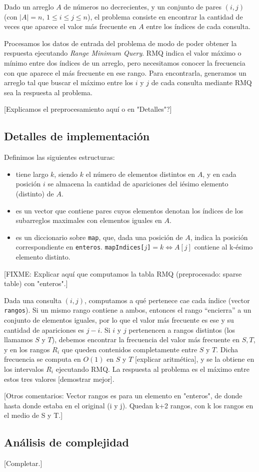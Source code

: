 Dado un arreglo $A$ de números no decrecientes, y un conjunto de pares $(i,j)$
(con $|A|=n$, $1 \le i \le j \le n$), el problema consiste en encontrar la
cantidad de veces que aparece el valor más frecuente en $A$ entre los índices de
cada consulta.

Procesamos los datos de entrada del problema de modo de poder obtener la
respuesta ejecutando {\sl Range Minimum Query}. RMQ indica el valor máximo o
mínimo entre dos índices de un arreglo, pero necesitamos conocer la frecuencia
con que aparece el más frecuente en ese rango. Para encontrarla, generamos un
arreglo tal que buscar el máximo entre los $i$ y $j$ de cada consulta mediante
RMQ sea la respuesta al problema.

[Explicamos el preprocesamiento aquí o en "Detalles"?]

\subsection*{Detalles de implementación}

Definimos las siguientes estructuras:

\begin{itemize}
  \item[\tt enteros] tiene largo $k$, siendo $k$ el número de elementos
  distintos en $A$, y en cada posición $i$ se almacena la cantidad de apariciones
  del iésimo elemento (distinto) de $A$.

  \item[\tt rangos] es un vector que contiene pares cuyos elementos denotan
  los índices de los subarreglos maximales con elementos iguales en $A$.

  \item[\tt mapIndices] es un diccionario sobre {\tt map}, que, dada una
  posición de $A$, indica la posición correspondiente en {\tt enteros}.
  {\tt mapIndices[$j$]}$=k \Leftrightarrow A[j]$ contiene al k-ésimo elemento
  distinto.
\end{itemize}

[FIXME: Explicar aquí que computamos la tabla RMQ (preprocesado: sparse table)
con "enteros".]

Dada una consulta $(i,j)$, computamos a qué pertenece cae cada índice (vector
{\tt rangos}). Si un mismo rango contiene a ambos, entonces el rango ``encierra''
a un conjunto de elementos iguales, por lo que el valor más frecuente es ese y
su cantidad de apariciones es $j-i$. Si $i$ y $j$ pertenencen a rangos distintos
(los llamamos $S$ y $T$), debemos encontrar la frecuencia del valor más
frecuente en $S,T$, y en los rangos $R_i$ que queden contenidos completamente
entre $S$ y $T$. Dicha frecuencia se computa en $O(1)$ en $S$ y $T$ [explicar
aritmética], y se la obtiene en los intervalos $R_i$ ejecutando RMQ. La
respuesta al problema es el máximo entre estos tres valores [demostrar mejor].

[Otros comentarios: Vector rangos es para un elemento en "enteros", de donde
hasta donde estaba en el original (i y j). Quedan k+2 rangos, con k los rangos
en el medio de S y T.]

\subsection*{Análisis de complejidad}

[Completar.]
